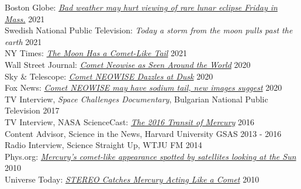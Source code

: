 \documentclass[12pt]{report}
\begin{document}
\noindent Boston Globe: \href{https://www.bostonglobe.com/2021/11/18/metro/bad-weather-may-hurt-viewing-rare-lunar-eclipse-early-friday-mass/}{{\it Bad weather may hurt viewing of rare lunar eclipse Friday in Mass.}} \hfill 2021\\
\noindent Swedish National Public Television: {\it Today a storm from the moon pulls past the earth} \hfill 2021\\
\noindent NY Times: \href{https://www.nytimes.com/2021/03/04/science/moon-tail-beam.html}{{\it The Moon Has a Comet-Like Tail}} \hfill 2021\\
\noindent Wall Street Journal: \href{https://www.wsj.com/articles/comet-neowise-as-seen-around-the-world-11595368898}{{\it Comet Neowise as Seen Around the World}} \hfill 2020\\
\noindent Sky \& Telescope: \href{https://skyandtelescope.org/astronomy-news/comet-neowise-dazzles-at-dusk/}{{\it Comet NEOWISE Dazzles at Dusk}} \hfill 2020\\
\noindent Fox News: \href{https://www.foxnews.com/science/comet-neowise-may-have-sodium-tail}{{\it Comet NEOWISE may have sodium tail, new images suggest}} \hfill 2020\\
\noindent TV Interview, {\it Space Challenges Documentary}, Bulgarian National Public Television \hfill 2017\\
\noindent TV Interview, NASA ScienceCast: \href{https://www.youtube.com/watch?v=Gibaxh9x7O0&ab_channel=ScienceAtNASA}{{\it The 2016 Transit of Mercury}} \hfill 2016\\
\noindent Content Advisor, Science in the News, Harvard University GSAS \hfill 2013 - 2016\\
\noindent Radio Interview, Science Straight Up, WTJU FM \hfill 2014\\
\noindent Phys.org: \href{https://phys.org/news/2010-09-mercury-comet-like-satellites-sun.html}{{\it Mercury's comet-like appearance spotted by satellites looking at the Sun}} \hfill 2010\\
\noindent Universe Today: \href{https://www.universetoday.com/74279/stereo-catches-mercury-acting-like-a-comet/}{{\it STEREO Catches Mercury Acting Like a Comet}} \hfill 2010\\
\end{document}
